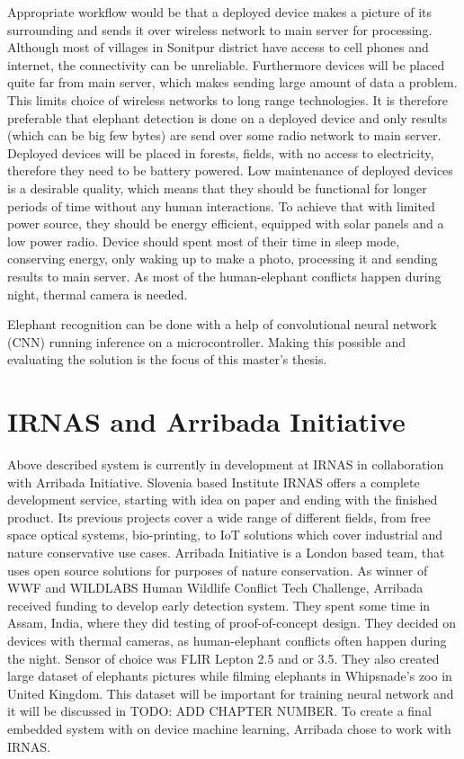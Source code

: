 Appropriate workflow would be that a deployed device makes a picture of its surrounding and sends it over wireless network to main server for processing.
Although most of villages in Sonitpur district have access to cell phones and internet, the connectivity can be unreliable\cite{wildlabs-elephants}. 
Furthermore devices will be placed quite far from main server, which makes sending large amount of data a problem. 
This limits choice of wireless networks to long range technologies.
It is therefore preferable that elephant detection is done on a deployed device and only results (which can be big few bytes) are send over some radio network to main server.
Deployed devices will be placed in forests, fields, with no access to electricity, therefore they need to be battery powered.
Low maintenance of deployed devices is a desirable quality, which means that they should be functional for longer periods of time without any human interactions.
To achieve that with limited power source, they should be energy efficient, equipped with solar panels and a low power radio.
Device should spent most of their time in sleep mode, conserving energy, only waking up to make a photo, processing it and sending results to main server.
As most of the human-elephant conflicts happen during night\cite{wildlabs-elephants}, thermal camera is needed.

Elephant recognition can be done with a help of convolutional neural network (CNN) running inference on a microcontroller. 
Making this possible and evaluating the solution is the focus of this master's thesis.


\section{ IRNAS and Arribada Initiative}

Above described system is currently in development at IRNAS in collaboration with Arribada Initiative.
Slovenia based Institute IRNAS offers a complete development service, starting with idea on paper and ending with the finished product. 
Its previous projects cover a wide range of different fields, from free space optical systems, bio-printing, to IoT solutions which cover industrial and nature conservative use cases.
Arribada Initiative is a London based team, that uses open source solutions for purposes of nature conservation.
As winner of WWF and WILDLABS Human Wildlife Conflict Tech Challenge\cite{wildlabs-winners}, Arribada received funding to develop early detection system.
They spent some time in Assam, India, where they did testing of proof-of-concept design\cite{arribada-assam}.
They decided on devices with thermal cameras, as human-elephant conflicts often happen during the night.
Sensor of choice was FLIR Lepton 2.5 and or 3.5.
They also created large dataset of elephants pictures while filming elephants in Whipsnade's zoo in United Kingdom. 
This dataset will be important for training neural network and it will be discussed in TODO: ADD CHAPTER NUMBER.
To create a final embedded system with on device machine learning, Arribada chose to work with IRNAS.


